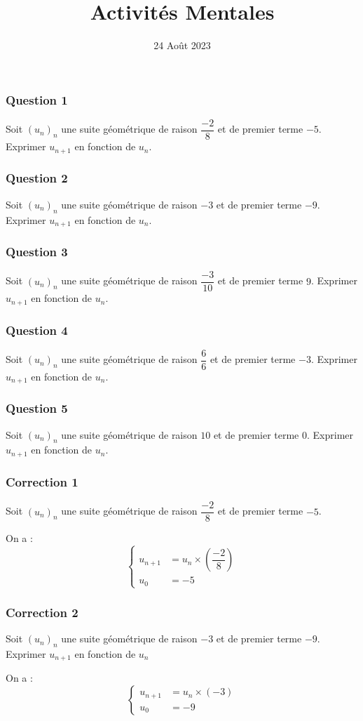 \documentclass[15pt, mathserif]{beamer}
\title{Activités Mentales}
\date{24 Août 2023}
\begin{document}
\begin{frame}
    \titlepage
\end{frame}

\begin{frame} 
	\frametitle{Question 1}
Soit $(u_n)_n$ une suite géométrique de raison $\dfrac{-2}{8}$ et de premier terme $-5$. Exprimer $u_{n+1}$ en fonction de $u_n$. \end{frame}


\begin{frame} 
	\frametitle{Question 2}
Soit $(u_n)_n$ une suite géométrique de raison $-3$ et de premier terme $-9$. Exprimer $u_{n+1}$ en fonction de $u_n$. \end{frame}


\begin{frame} 
	\frametitle{Question 3}
Soit $(u_n)_n$ une suite géométrique de raison $\dfrac{-3}{10}$ et de premier terme $9$. Exprimer $u_{n+1}$ en fonction de $u_n$. \end{frame}


\begin{frame} 
	\frametitle{Question 4}
Soit $(u_n)_n$ une suite géométrique de raison $\dfrac{6}{6}$ et de premier terme $-3$. Exprimer $u_{n+1}$ en fonction de $u_n$. \end{frame}


\begin{frame} 
	\frametitle{Question 5}
Soit $(u_n)_n$ une suite géométrique de raison $10$ et de premier terme $0$. Exprimer $u_{n+1}$ en fonction de $u_n$. \end{frame}


\begin{frame}
\vspace{-10mm}
	\frametitle{Correction 1}
Soit $(u_n)_n$ une suite géométrique de raison $\dfrac{-2}{8}$ et de premier terme $-5$. 
 
 On a : $$ \left\{ 
 \begin{array}{ll} 
 u_{n+1} &= u_n \times \left( \dfrac{-2}{8} \right) \\ 
 u_0 & = -5 
 \end{array} 
 \right. $$ 
 \end{frame}


\begin{frame}
\vspace{-10mm}
	\frametitle{Correction 2}
Soit $(u_n)_n$ une suite géométrique de raison $-3$ et de premier terme $-9$. Exprimer $u_{n+1}$ en fonction de $u_n$ 
 
 On a : $$ \left\{ 
 \begin{array}{ll} 
 u_{n+1} &= u_n \times \left(-3\right) \\ 
 u_0 & = -9 
 \end{array} 
 \right. $$ 
 \end{frame}
\end{document}
